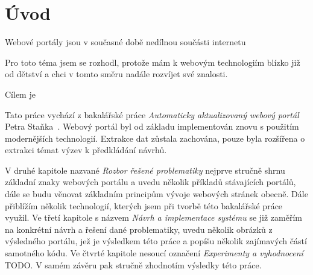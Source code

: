 \chapter{Úvod}
Webové portály jsou v současné době nedílnou součásti internetu \blindtext

Pro toto téma jsem se rozhodl, protože mám k webovým technologiím blízko již od dětství a chci v tomto směru nadále rozvíjet své znalosti.

Cílem je \blindtext

Tato práce vychází z bakalářské práce \emph{Automaticky aktualizovaný webový portál} Petra Staňka~\cite{bib:stanek}.
Webový portál byl od základu implementován znovu s použitím modernějších technologií. Extrakce dat zůstala zachována, pouze byla rozšířena o extrakci témat výzev k předkládání návrhů.

V druhé kapitole nazvané \emph{Rozbor řešené problematiky} nejprve stručně shrnu základní znaky webových portálu a uvedu několik příkladů stávajících portálů, dále se budu věnovat základním principům vývoje webových stránek obecně. Dále přiblížím několik technologií, kterých jsem při tvorbě této bakalářské práce využil.
Ve třetí kapitole s názvem \emph{Návrh a implementace systému} se již zaměřím na konkrétní návrh a řešení dané problematiky, uvedu několik obrázků z výsledného portálu, jež je výsledkem této práce a popíšu několik zajímavých částí samotného kódu.
Ve čtvrté kapitole nesoucí označení \emph{Experimenty a vyhodnocení} TODO. V samém závěru pak stručně zhodnotím výsledky této práce.
